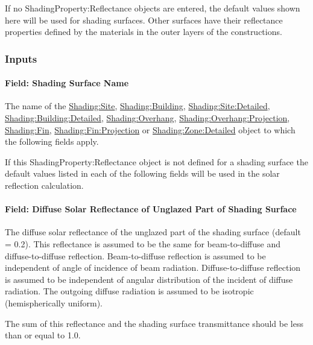 If no ShadingProperty:Reflectance objects are entered, the default values shown here will be used for shading surfaces. Other surfaces have their reflectance properties defined by the materials in the outer layers of the constructions.

\subsubsection{Inputs}\label{inputs-31-002}

\paragraph{Field: Shading Surface Name}\label{field-shading-surface-name}

The name of the \hyperref[shadingsite-shadingbuilding]{Shading:Site}, \hyperref[shadingsite-shadingbuilding]{Shading:Building}, \hyperref[shadingsitedetailed-shadingbuildingdetailed]{Shading:Site:Detailed}, \hyperref[shadingsitedetailed-shadingbuildingdetailed]{Shading:Building:Detailed}, \hyperref[shadingoverhang]{Shading:Overhang}, \hyperref[shadingoverhangprojection]{Shading:Overhang:Projection}, \hyperref[shadingfin]{Shading:Fin}, \hyperref[shadingfinprojection]{Shading:Fin:Projection} or \hyperref[shadingzonedetailed-000]{Shading:Zone:Detailed} object to which the following fields apply.

If this ShadingProperty:Reflectance object is not defined for a shading surface the default values listed in each of the following fields will be used in the solar reflection calculation.

\paragraph{Field: Diffuse Solar Reflectance of Unglazed Part of Shading Surface}\label{field-diffuse-solar-reflectance-of-unglazed-part-of-shading-surface}

The diffuse solar reflectance of the unglazed part of the shading surface (default = 0.2). This reflectance is assumed to be the same for beam-to-diffuse and diffuse-to-diffuse reflection. Beam-to-diffuse reflection is assumed to be independent of angle of incidence of beam radiation. Diffuse-to-diffuse reflection is assumed to be independent of angular distribution of the incident of diffuse radiation. The outgoing diffuse radiation is assumed to be isotropic (hemispherically uniform).

The sum of this reflectance and the shading surface transmittance should be less than or equal to 1.0.

